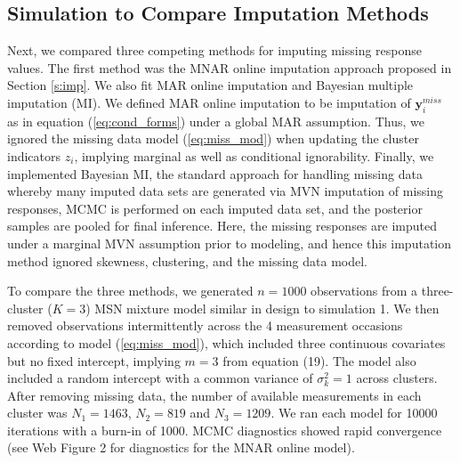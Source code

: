 \documentclass[useAMS,usenatbib,referee]{biom}
\begin{document}
\subsection{Simulation to Compare Imputation Methods}
Next, we compared three competing methods for imputing missing response values. The first method was the MNAR online imputation approach proposed in Section \ref{s:imp}. We also fit MAR online imputation and Bayesian multiple imputation (MI). We defined MAR online imputation to be imputation of $\mathbf{y}_i^{miss}$ as in equation (\ref{eq:cond_forms}) under a global MAR assumption. Thus, we ignored the missing data model (\ref{eq:miss_mod}) when updating the cluster indicators $z_i$, implying marginal as well as conditional ignorability. Finally, we implemented Bayesian MI, the standard approach for handling missing data whereby many imputed data sets are generated via MVN imputation of missing responses, MCMC is performed on each imputed data set, and the posterior samples are pooled for final inference. Here, the missing responses are imputed under a marginal MVN assumption prior to modeling, and hence this imputation method ignored skewness, clustering, and the missing data model.

To compare the three methods, we generated $n = 1000$ observations from a three-cluster ($K = 3$) MSN mixture model similar in design to simulation 1. We then removed observations intermittently across the 4 measurement occasions according to model (\ref{eq:miss_mod}), which included three continuous covariates but no fixed intercept, implying $m = 3$ from equation (19). The model also included a random intercept with a common variance of $\sigma^2_k = 1$ across clusters. After removing missing data, the number of available measurements in each cluster was $N_1=1463$, $N_2=819$ and $N_3=1209$. We ran each model for 10000 iterations with a burn-in of 1000. MCMC diagnostics showed rapid convergence (see Web Figure 2 for diagnostics for the MNAR online model).
\end{document}
